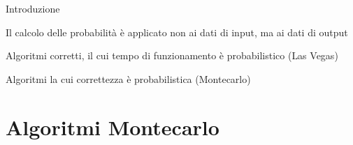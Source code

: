 \begin{frame}{Introduzione}

\vspace{-9pt}
\begin{myboxtitle}
Il calcolo delle probabilità è applicato non ai dati di input, ma ai dati di output
\BIL
\item  Algoritmi corretti, il cui tempo di funzionamento è probabilistico (\alert{Las Vegas})
\item Algoritmi la cui correttezza è probabilistica (\alert{Montecarlo})
\EIL
\end{myboxtitle}

\end{frame}

\section{Algoritmi Montecarlo}

